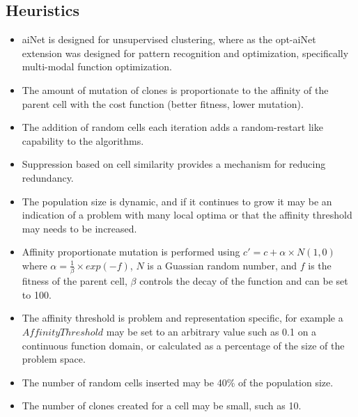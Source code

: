 \subsection{Heuristics}
\begin{itemize}
	\item aiNet is designed for unsupervised clustering, where as the opt-aiNet extension was designed for pattern recognition and optimization, specifically multi-modal function optimization.
	\item The amount of mutation of clones is proportionate to the affinity of the parent cell with the cost function (better fitness, lower mutation).
	\item The addition of random cells each iteration adds a random-restart like capability to the algorithms.
	\item Suppression based on cell similarity provides a mechanism for reducing redundancy.
	\item The population size is dynamic, and if it continues to grow it may be an indication of a problem with many local optima or that the affinity threshold may needs to be increased.
	\item Affinity proportionate mutation is performed using $c' = c + \alpha \times N(1,0)$ where $\alpha = \frac{1}{\beta} \times exp(-f)$, $N$ is a Guassian random number, and $f$ is the fitness of the parent cell, $\beta$ controls the decay of the function and can be set to 100. 
	\item The affinity threshold is problem and representation specific, for example a $AffinityThreshold$ may be set to an arbitrary value such as 0.1 on a continuous function domain, or calculated as a percentage of the size of the problem space.
	\item The number of random cells inserted may be 40\% of the population size. 
	\item The number of clones created for a cell may be small, such as 10.
\end{itemize}

